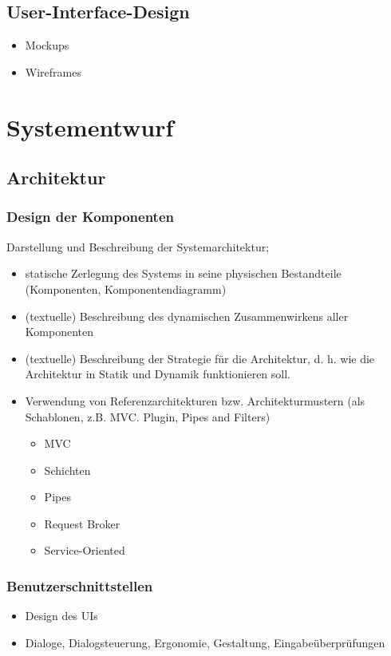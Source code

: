 \section{User-Interface-Design}
\begin{itemize}
	\item Mockups
	\item Wireframes
\end{itemize}


\chapter{Systementwurf}

\section{Architektur}

\subsection{Design der Komponenten}

Darstellung und Beschreibung der Systemarchitektur;

\begin{itemize}
	\item  statische Zerlegung des Systems in seine physischen Bestandteile (Komponenten, Komponentendiagramm)
	\item (textuelle) Beschreibung des dynamischen Zusammenwirkens aller Komponenten 
	\item (textuelle) Beschreibung der Strategie für die Architektur, d. h. wie die Architektur in Statik und Dynamik funktionieren soll.
	\item Verwendung von Referenzarchitekturen bzw. Architekturmustern (als Schablonen, z.B. MVC. Plugin, Pipes and Filters)
	\begin{itemize}
		\item MVC
		\item Schichten
		\item Pipes
		\item Request Broker
		\item Service-Oriented
	\end{itemize}
\end{itemize}

\subsection{Benutzerschnittstellen} 
\begin{itemize}
	\item Design des UIs
	\item Dialoge, Dialogsteuerung, Ergonomie, Gestaltung, Eingabeüberprüfungen
\end{itemize}

